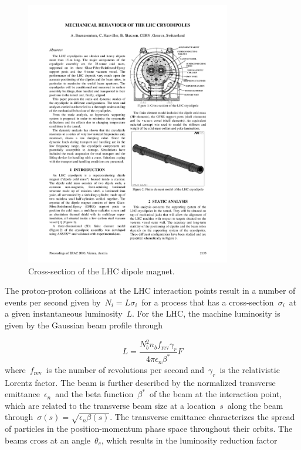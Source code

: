 \begin{figure}
\begin{centering}
\includegraphics[width=0.8\textwidth]{figures/exp/cryodipole.pdf}
\caption{Cross-section of the LHC dipole magnet.}
\label{fig:lhc_magnet}
\end{centering}
\end{figure}

The proton-proton collisions at the LHC interaction points result in a number of events per second given by~$N_i = L \sigma_i$~for a process that has a cross-section~$\sigma_i$~at a given instantaneous luminosity~$L$. For the LHC, the machine luminosity is given by the Gaussian beam profile through

\begin{equation}
L = \frac{N_b^2 n_b f_\mathrm{rev} \gamma_r}{4 \pi \epsilon_n \beta^*} F
\end{equation}
where~$f_{\mathrm{rev}}$~is the number of revolutions per second and~$\gamma_r$~is the relativistic Lorentz factor. The beam is further described by the normalized transverse emittance~$\epsilon_n$~and the beta function~$\beta^*$~of the beam at the interaction point, which are related to the transverse beam size at a location~$s$~along the beam through~$\sigma(s) = \sqrt{\epsilon_n \beta(s)}$. The transverse emittance characterizes the spread of particles in the position-momentum phase space throughout their orbits. The beams cross at an angle~$\theta_c$, which results in the luminosity reduction factor

